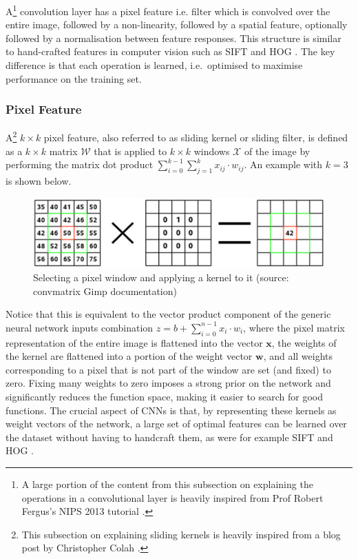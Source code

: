 \documentclass[a4paper,11pt]{article}
\begin{document}
A\footnote{A large portion of the content from this subsection on explaining the operations in a convolutional layer is heavily inspired from Prof Robert Fergus's NIPS 2013 tutorial \cite{fergus_tutorial}.} convolution layer has a pixel feature i.e. filter which is convolved over the entire image, followed by a non-linearity, followed by a spatial feature, optionally followed by a normalisation between feature responses. This structure is similar to hand-crafted features in computer vision such as SIFT and HOG \cite{SIFT}. The key difference is that each operation is learned, i.e.\ optimised to maximise performance on the training set. \\

\subsubsection{Pixel Feature}

A\footnote{This subsection on explaining sliding kernels is heavily inspired from a blog post by Christopher Colah \cite{colah}.} $k \times k$ pixel feature, also referred to as sliding kernel or sliding filter, is defined as a $k \times k$ matrix $\mathcal{W}$ that is applied to $k \times k$ windows $\mathcal{X}$ of the image by performing  the matrix dot product $\sum_{i=0}^{k-1} \sum_{j=1}^{k} x_{ij} \cdot w_{ij}$. An example with $k=3$ is shown below.

\begin{figure}[h!]
	\centering
	\includegraphics[scale=0.3]{images/window_x_kernel.png}
	\caption{Selecting a pixel window and applying a kernel to it (source: convmatrix Gimp documentation)}
\end{figure}

Notice that this is equivalent to the vector product component of the generic neural network inputs combination $z = b + \sum\limits_{i=0}^{n-1} x_{i}\cdot w_{i}$, where the pixel matrix representation of the entire image is flattened into the vector $\textbf{x}$, the weights of the kernel are flattened into a portion of the weight vector $\textbf{w}$, and all weights corresponding to a pixel that is not part of the window are set (and fixed) to zero. Fixing many weights to zero imposes a strong prior on the network and significantly reduces the function space, making it easier to search for good functions. The crucial aspect of CNNs is that, by representing these kernels as weight vectors of the network, a large set of optimal features can be learned over the dataset without having to handcraft them, as were for example SIFT and HOG \cite{SIFT}. \\
\end{document}
